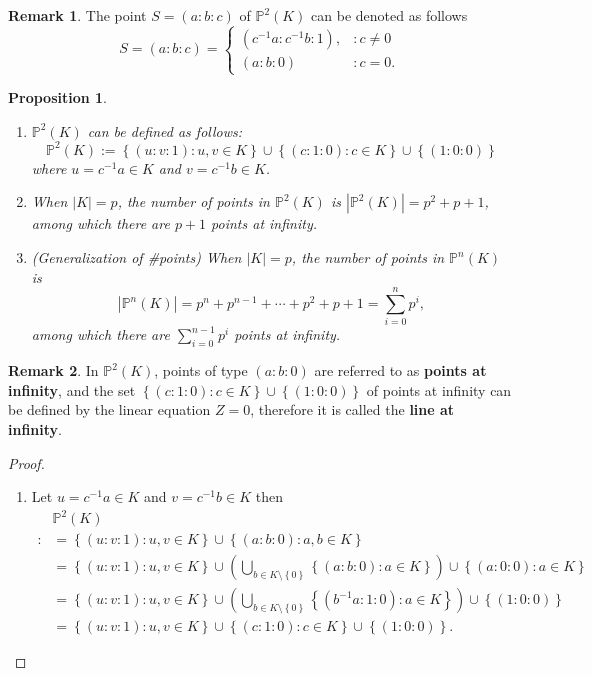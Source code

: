 \documentclass[12pt,openany]{book}
\newtheorem{proposition}[theorem]{Proposition}
\theoremstyle{definition}
\newtheorem{remark}{Remark}[chapter]
\newcommand{\set}[1]{\left\{#1\right\}}
\newcommand{\inv}[1]{#1^{-1}}
\newcommand{\of}[1]{\left( #1 \right)}
\newcommand{\abs}[1]{\left\lvert #1 \right\rvert}
\begin{document}
	\vspace{4pt}
	\begin{remark}
		The point $S=(a:b:c)$ of $\mathbb{P}^2(K)$ can be denoted as follows \[
		S=(a:b:c)=\begin{cases}
			(\inv{c}a:\inv{c}b:1), &:c\neq 0\\
			(a:b:0) &: c=0.
		\end{cases}
		\]
	\end{remark}
	\vspace{8pt}
	\begin{tcolorbox}[colback=white,colframe=procolor,arc=5pt,title={\color{white}\bf }]
		\begin{proposition}
			\ \begin{enumerate}[(1)]
				\item $\mathbb{P}^2(K)$ can be defined as follows: \[
				\mathbb{P}^2(K):=\set{(u:v:1):u,v\in K}\cup\set{(c:1:0):c\in K}\cup\set{(1:0:0)}
				\] where $u=c^{-1}a\in K$ and $v=c^{-1}b\in K$.
				\item When $\abs{K}=p$, the number of points in $\mathbb{P}^2(K)$ is $\abs{\mathbb{P}^2(K)}=p^2+p+1$, among which there are $p+1$ points at infinity.
				\item (Generalization of \#points) When $\abs{K}=p$, the number of points in $\mathbb{P}^n(K)$ is \[
				\abs{\mathbb{P}^n(K)}=p^n+p^{n-1}+\cdots+p^2+p+1=\sum_{i=0}^np^i,
				\] among which there are $\sum_{i=0}^{n-1}p^i$ points at infinity.
			\end{enumerate}
		\end{proposition}
	\end{tcolorbox}
	\begin{remark}
		In $\mathbb{P}^2(K)$, points of type $(a:b:0)$ are referred to as \textbf{points at infinity}, and the set $\set{(c:1:0):c\in K}\cup\set{(1:0:0)}$ of points at infinity can be defined by the linear equation $Z=0$, therefore it is called the \textbf{line at infinity}.
	\end{remark}
	\begin{proof}
		\begin{enumerate}[(1)]
			\item Let $u=c^{-1}a\in K$ and $v=c^{-1}b\in K$ then \begin{align*}
				&\mathbb{P}^2(K)\\
				:&=\set{(u:v:1):u,v\in K}\cup\set{(a:b:0):a,b\in K}\\
				&=\set{(u:v:1):u,v\in K}\cup\of{\bigcup_{b\in K\setminus\set{0}}\set{(a:b:0):a\in K}}\cup\set{(a:0:0):a\in K}\\
				&=\set{(u:v:1):u,v\in K}\cup\of{\bigcup_{b\in K\setminus\set{0}}\set{(b^{-1}a:1:0):a\in K}}\cup\set{(1:0:0)}\\
				&=\set{(u:v:1):u,v\in K}\cup\set{(c:1:0):c\in K}\cup\set{(1:0:0)}.
			\end{align*}
		\end{enumerate}
	\end{proof}
\end{document}
